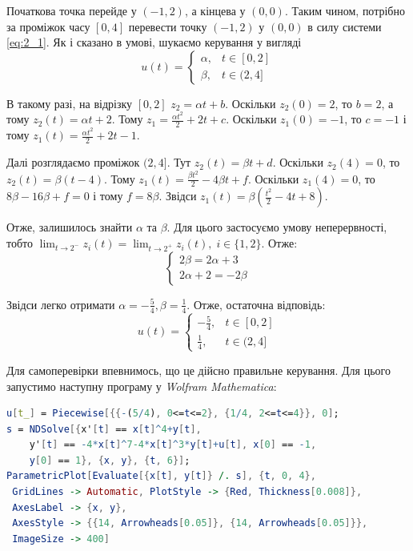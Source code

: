 \documentclass[oneside,solution]{karazin-control-assign}
\begin{document}
Початкова точка перейде у $(-1,2)$, а кінцева у $(0,0)$. Таким чином, потрібно за проміжок часу $[0,4]$ перевести точку $(-1,2)$ у $(0,0)$ в силу системи \ref{eq:2_1}. Як і сказано в умові, шукаємо керування у вигляді
\begin{equation}
    u(t) = \begin{cases}
        \alpha, & t \in [0, 2] \\
        \beta, & t \in (2, 4]
    \end{cases}
\end{equation}

В такому разі, на відрізку $[0,2]$ $z_2=\alpha t + b$. Оскільки $z_2(0) = 2$, то $b=2$, а тому $z_2(t)=\alpha t + 2$. Тому $z_1 = \frac{\alpha t^2}{2} + 2t + c$. Оскільки $z_1(0)=-1$, то $c=-1$ і тому $z_1(t) = \frac{\alpha t^2}{2} + 2t - 1$.

Далі розглядаємо проміжок $(2,4]$. Тут $z_2(t) = \beta t + d$. Оскільки $z_2(4)=0$, то $z_2(t) = \beta (t - 4)$. Тому $z_1(t) = \frac{\beta t^2}{2} - 4\beta t + f$. Оскільки $z_1(4)=0$, то $8\beta - 16\beta + f = 0$ і тому $f=8\beta$. Звідси $z_1(t) = \beta\left(\frac{t^2}{2} - 4t + 8\right)$.

Отже, залишилось знайти $\alpha$ та $\beta$. Для цього застосуємо умову неперервності, тобто $\lim_{t \to 2^-}z_i(t) = \lim_{t \to 2^+}z_i(t), \; i \in \{1,2\}$. Отже:
\begin{equation}
    \begin{cases}
    2\beta = 2\alpha + 3 \\
    2\alpha + 2 = -2\beta
    \end{cases}
\end{equation}

Звідси легко отримати $\alpha=-\frac{5}{4},\beta=\frac{1}{4}$. Отже, остаточна відповідь:
\begin{equation}
    u(t) = \begin{cases}
        -\frac{5}{4}, & t \in [0,2] \\
        \frac{1}{4}, & t \in (2,4]
    \end{cases}
\end{equation}

Для самоперевірки впевнимось, що це дійсно правильне керування. Для цього запустимо наступну програму у \textit{Wolfram Mathematica}:

\begin{lstlisting}[language=Mathematica]
u[t_] = Piecewise[{{-(5/4), 0<=t<=2}, {1/4, 2<=t<=4}}, 0];
s = NDSolve[{x'[t] == x[t]^4+y[t], 
    y'[t] == -4*x[t]^7-4*x[t]^3*y[t]+u[t], x[0] == -1, 
    y[0] == 1}, {x, y}, {t, 6}];
ParametricPlot[Evaluate[{x[t], y[t]} /. s], {t, 0, 4}, 
 GridLines -> Automatic, PlotStyle -> {Red, Thickness[0.008]}, 
 AxesLabel -> {x, y}, 
 AxesStyle -> {{14, Arrowheads[0.05]}, {14, Arrowheads[0.05]}}, 
 ImageSize -> 400]
\end{lstlisting}
\end{document}

